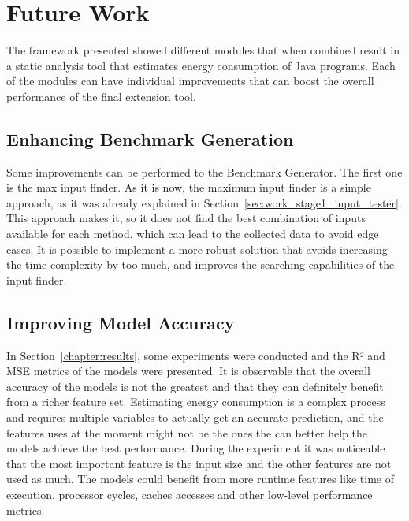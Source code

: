 \chapter{Future Work}\label{chapter:future_work}


The framework presented showed different modules that when combined result in a static analysis tool that estimates energy consumption of Java programs. Each of the modules can have individual improvements that can boost the overall performance of the final extension tool.


\section{Enhancing Benchmark Generation} \label{sec:future_work_enhancing_program_generation}

Some improvements can be performed to the Benchmark Generator. The first one is the max input finder. As it is now, the maximum input finder is a simple approach, as it was already explained in Section~\ref{sec:work_stage1_input_tester}. This approach makes it, so it does not find the best combination of inputs available for each method, which can lead to the collected data to avoid edge cases. It is possible to implement a more robust solution that avoids increasing the time complexity by too much, and improves the searching capabilities of the input finder.

\section{Improving Model Accuracy} \label{sec:future_work_improving_model_accuracy}

In Section~\ref{chapter:results}, some experiments were conducted and the R² and MSE metrics of the models were presented. It is observable that the overall accuracy of the models is not the greatest and that they can definitely benefit from a richer feature set. Estimating energy consumption is a complex process and requires multiple variables to actually get an accurate prediction, and the features uses at the moment might not be the ones the can better help the models achieve the best performance. During the experiment it was noticeable that the most important feature is the input size and the other features are not used as much. The models could benefit from more runtime features like time of execution, processor cycles, caches accesses and other low-level performance metrics.


